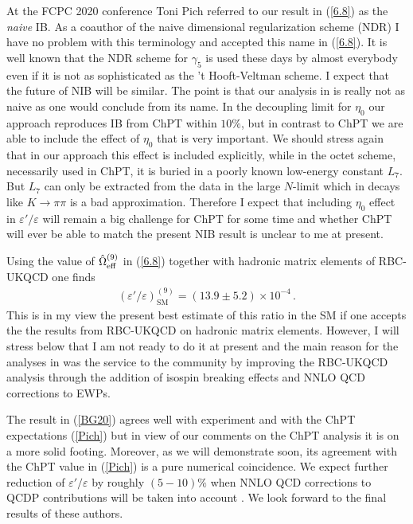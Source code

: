 \documentclass[12pt,a4paper]{article}
\def\epe{\varepsilon'/\varepsilon}
\begin{document}
  At the FCPC 2020 conference Toni Pich referred to our result in (\ref{6.8})
  as the {\em naive} IB. As a coauthor of the naive dimensional regularization scheme
  (NDR) \cite{Buras:1989xd} I have no problem with this terminology
  and accepted this name  in (\ref{6.8}). It is well known that the NDR scheme for
  $\gamma_5$ is used these days by almost everybody even if it is not as
  sophisticated as the 't Hooft-Veltman scheme. I expect that the future
  of NIB will be similar. The point is that our analysis in \cite{Buras:2020pjp}
  is really not as naive as one would conclude from its name. In the
  decoupling limit for $\eta_0$ our approach reproduces IB from
  ChPT within $10\%$, but in contrast to ChPT we are able to
  include the effect of $\eta_0$ that is very important. We should
  stress again that in our approach this effect is included explicitly, while
  in the octet scheme, necessarily used in ChPT, it is buried in a poorly
  known low-energy constant $L_7$. But $L_7$ can only be extracted from
  the data in the large $N$-limit which in decays like $K\to\pi\pi$ is
  a bad approximation. Therefore I expect that including $\eta_0$
  effect in $\epe$ will remain a big challenge for ChPT for 
  some time  and whether ChPT will  ever be able to match the present NIB result
  is unclear to me at present.

  Using the value of $\hat\Omega_{\rm eff}^{(9)}$ in (\ref{6.8}) together with
  hadronic matrix elements of RBC-UKQCD one finds
  \cite{Buras:2020pjp,Aebischer:2020jto}
\begin{align}
  \label{BG20}
  \boxed{
  (\epe)^{(9)}_\text{SM}
    = (13.9 \pm 5.2) \times 10^{-4} \,.}
\end{align}
 This is in my view  the present best estimate of this ratio in the SM if one
accepts the the results from RBC-UKQCD on hadronic matrix elements.
However, I will stress below that I am not ready to do it at present
and the main reason for the analyses in  \cite{Buras:2020pjp,Aebischer:2020jto}
was the service to the community by improving the RBC-UKQCD analysis through the addition of  isospin breaking effects
and NNLO QCD corrections to EWPs.

The result in (\ref{BG20}) agrees  well with experiment and with the ChPT expectations (\ref{Pich})
but in view of our comments on the ChPT analysis it is on a more solid footing.
Moreover, as we will demonstrate soon, its agreement with the ChPT value in (\ref{Pich}) is a pure numerical coincidence. We expect further reduction of $\epe$  by roughly $(5-10)\%$ when NNLO QCD
corrections to QCDP contributions will be taken into account
\cite{Cerda-Sevilla:2016yzo, Cerda-Sevilla:2018hjk}. We look forward
to the final results of these authors.
\end{document}
